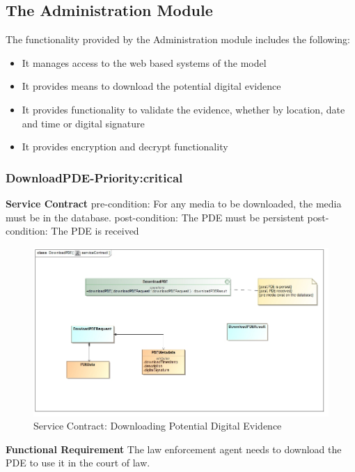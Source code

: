 \documentclass[a4paper,12pt]{article}
\begin{document}
\subsection{The Administration Module}
The functionality provided by the Administration module includes the following:
\begin{itemize}
\item It manages access to the web based systems of the model
\item It provides means to download the potential digital evidence
\item It provides functionality to validate the evidence, whether by location, date and time or digital signature
\item It provides encryption and decrypt functionality
\end{itemize}
\subsubsection{DownloadPDE-Priority:critical}
\textbf{Service Contract}\newline
pre-condition: For any media to be downloaded, the media must be in the database.\newline
post-condition: The PDE must be persistent\newline
post-condition: The PDE is received\newline
\begin{figure}[H]
\includegraphics[width=1.0\textwidth]{images/downloadserviceContract.jpg}
\caption{Service Contract: Downloading Potential Digital Evidence \label{overflow}}
\end{figure}
\textbf{Functional Requirement}\newline
	The law enforcement agent needs to download the PDE to use it in the court of law. \newpage
\end{document}
